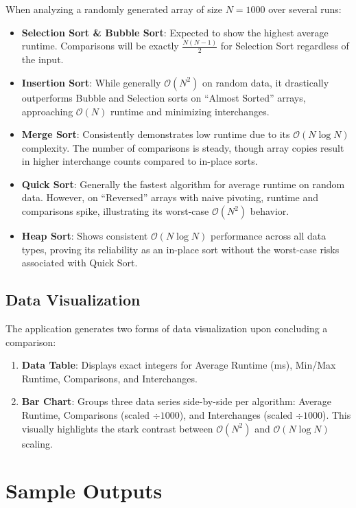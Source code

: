\documentclass[11pt,a4paper]{article}
\begin{document}
When analyzing a randomly generated array of size $N = 1000$ over several runs:

\begin{itemize}[itemsep=0.3em]
    \item \textbf{Selection Sort \& Bubble Sort}: Expected to show the highest average runtime. Comparisons will be exactly $\frac{N(N-1)}{2}$ for Selection Sort regardless of the input.
    \item \textbf{Insertion Sort}: While generally $\mathcal{O}(N^2)$ on random data, it drastically outperforms Bubble and Selection sorts on ``Almost Sorted'' arrays, approaching $\mathcal{O}(N)$ runtime and minimizing interchanges.
    \item \textbf{Merge Sort}: Consistently demonstrates low runtime due to its $\mathcal{O}(N \log N)$ complexity. The number of comparisons is steady, though array copies result in higher interchange counts compared to in-place sorts.
    \item \textbf{Quick Sort}: Generally the fastest algorithm for average runtime on random data. However, on ``Reversed'' arrays with naive pivoting, runtime and comparisons spike, illustrating its worst-case $\mathcal{O}(N^2)$ behavior.
    \item \textbf{Heap Sort}: Shows consistent $\mathcal{O}(N \log N)$ performance across all data types, proving its reliability as an in-place sort without the worst-case risks associated with Quick Sort.
\end{itemize}

\subsection*{Data Visualization}

The application generates two forms of data visualization upon concluding a comparison:
\begin{enumerate}[itemsep=0.1em]
    \item \textbf{Data Table}: Displays exact integers for Average Runtime (ms), Min/Max Runtime, Comparisons, and Interchanges.
    \item \textbf{Bar Chart}: Groups three data series side-by-side per algorithm: Average Runtime, Comparisons (scaled $\div 1000$), and Interchanges (scaled $\div 1000$). This visually highlights the stark contrast between $\mathcal{O}(N^2)$ and $\mathcal{O}(N \log N)$ scaling.
\end{enumerate}

\newpage
\section{Sample Outputs}
\end{document}
